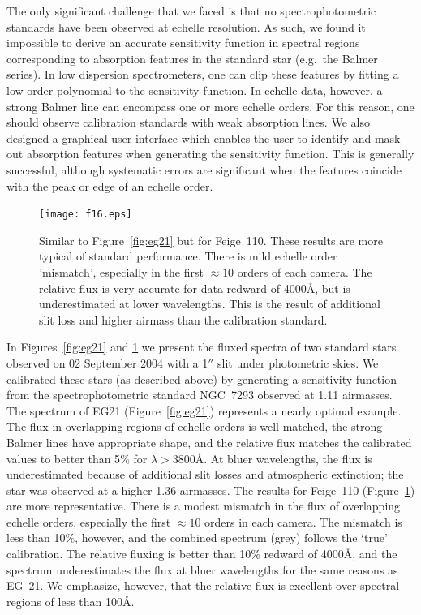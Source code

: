 \documentclass[]{emulateapj}
\begin{document}
The only significant challenge that we faced is that no spectrophotometric
standards have been observed at echelle resolution.  
As such, we found it impossible to derive an accurate sensitivity 
function in spectral regions corresponding to
absorption features in the standard star (e.g.\ the Balmer series).
In low dispersion spectrometers, one can clip these features
by fitting a low order polynomial to the sensitivity function. 
In echelle data, however, a strong Balmer
line can encompass one or more echelle orders.   For this reason,
one should observe calibration standards with weak
absorption lines.  We also designed a graphical user interface
which enables the user to identify and mask out absorption features
when generating the sensitivity function.  This is generally 
successful, although systematic errors are significant when the
features coincide with the peak or edge of an echelle order.


\begin{figure}
\texttt{[image: f16.eps]}
\caption{Similar to Figure~\ref{fig:eg21} but for Feige~110.
These results are more typical of standard performance.  There is mild
echelle order 'mismatch', especially in the first $\approx 10$
orders of each camera.  The relative flux is very accurate for
data redward of 4000\AA, but is underestimated at
lower wavelengths.  This is the result of additional slit loss
and higher airmass than the calibration standard.
}
\label{fig:feige110}
\end{figure}


In Figures~\ref{fig:eg21} and \ref{fig:feige110}
we present the fluxed spectra of two standard stars observed
on 02 September 2004 with a 1$''$ slit under photometric skies.
We calibrated these stars (as described above) by generating
a sensitivity function from the spectrophotometric standard
NGC~7293 observed at 1.11 airmasses.
The spectrum of EG21 (Figure~\ref{fig:eg21}) represents
a nearly optimal example.  The flux in overlapping regions of
echelle orders is well matched, the strong Balmer lines have 
appropriate shape, and the relative flux matches the 
calibrated values \citep{hamuy94} to better than 5$\%$ for
$\lambda > 3800$\AA.  At bluer wavelengths, the flux is underestimated
because of additional slit losses and atmospheric 
extinction;  the star was observed at a higher 1.36 airmasses.
The results for Feige~110 (Figure~\ref{fig:feige110}) are more
representative.  There is a modest mismatch
in the flux of overlapping echelle orders, especially the
first $\approx 10$ orders in each camera.  The mismatch is less
than 10$\%$, however, and the combined spectrum (grey) follows
the `true' calibration.  The relative fluxing is better than 10$\%$
redward of 4000\AA, and the spectrum underestimates the
flux at bluer wavelengths for the same reasons as EG~21.
We emphasize, however, that the relative flux is excellent over
spectral regions of less than 100\AA.
\end{document}
